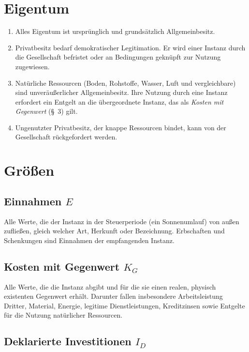 \documentclass[11pt,a4paper]{article}
\begin{document}
\section{Eigentum}

\begin{enumerate}
  \item[(1)] Alles Eigentum ist ursprünglich und grundsätzlich Allgemeinbesitz.
  
  \item[(2)] Privatbesitz bedarf demokratischer Legitimation. Er wird einer Instanz durch die Gesellschaft befristet oder an Bedingungen geknüpft zur Nutzung zugewiesen.
  
  \item[(3)] Natürliche Ressourcen (Boden, Rohstoffe, Wasser, Luft und vergleichbare) sind unveräußerlicher Allgemeinbesitz. Ihre Nutzung durch eine Instanz erfordert ein Entgelt an die übergeordnete Instanz, das als \textit{Kosten mit Gegenwert} (\S~3) gilt.
  
  \item[(4)] Ungenutzter Privatbesitz, der knappe Ressourcen bindet, kann von der Gesellschaft rückgefordert werden.
\end{enumerate}

\section{Größen}

\subsection{Einnahmen \( E \)}

Alle Werte, die der Instanz in der Steuerperiode (ein Sonnenumlauf) von außen zufließen, gleich welcher Art, Herkunft oder Bezeichnung. Erbschaften und Schenkungen sind Einnahmen der empfangenden Instanz.

\subsection{Kosten mit Gegenwert \( K_G \)}

Alle Werte, die die Instanz abgibt und für die sie einen realen, physisch existenten Gegenwert erhält. Darunter fallen insbesondere Arbeitsleistung Dritter, Material, Energie, legitime Dienstleistungen, Kreditzinsen sowie Entgelte für die Nutzung natürlicher Ressourcen.

\subsection{Deklarierte Investitionen \( I_D \)}
\end{document}

